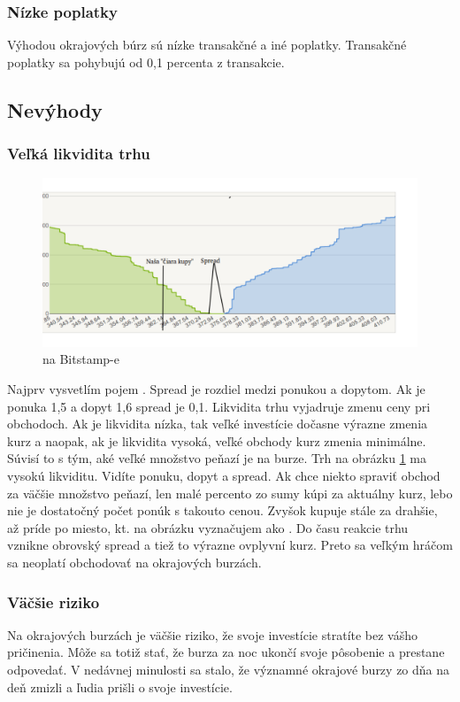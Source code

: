 \subsubsection{Nízke poplatky} 
Výhodou okrajových búrz sú nízke transakčné a iné poplatky. Transakčné poplatky sa pohybujú od 0,1 percenta z transakcie. 
\subsection{Nevýhody} 
\subsubsection{Veľká likvidita trhu} 
\begin{figure}[!hbt]
\begin{center}
\includegraphics[width=1\textwidth]{stamp}
\caption{ na Bitstamp-e}
\label{img:ob}
\end{center}
\end{figure}
Najprv vysvetlím pojem \cite{ZAC}. Spread je rozdiel medzi ponukou a dopytom. Ak je ponuka 1,5 a dopyt 1,6 spread je 0,1. Likvidita trhu vyjadruje zmenu ceny pri obchodoch. Ak je likvidita nízka, tak veľké investície dočasne výrazne zmenia kurz a naopak, ak je likvidita vysoká, veľké obchody kurz zmenia minimálne. Súvisí to s tým, aké veľké množstvo peňazí je na burze. Trh na obrázku \ref{img:ob} ma vysokú likviditu. Vidíte ponuku, dopyt a spread. Ak chce niekto spraviť obchod za väčšie množstvo peňazí, len malé percento zo sumy kúpi za aktuálny kurz, lebo nie je dostatočný počet ponúk s takouto cenou. Zvyšok kupuje stále za drahšie, až príde po miesto, kt. na obrázku vyznačujem ako . Do času reakcie trhu vznikne obrovský spread a tiež to výrazne ovplyvní kurz. Preto sa veľkým hráčom sa neoplatí obchodovať na okrajových burzách. 
\subsubsection{Väčšie riziko} 
Na okrajových burzách je väčšie riziko, že svoje investície stratíte bez vášho pričinenia. Môže sa totiž stať, že burza za noc ukončí svoje pôsobenie a prestane odpovedať. V nedávnej minulosti sa stalo, že významné okrajové burzy zo dňa na deň zmizli a ľudia prišli o svoje investície.  

